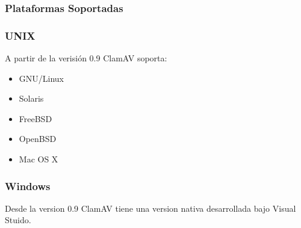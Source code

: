 \subsubsection{Plataformas Soportadas}

\subsubsection*{UNIX}

A partir de la  verisión 0.9 ClamAV soporta:
\begin{itemize}
 \item GNU/Linux
 \item Solaris
 \item FreeBSD
 \item OpenBSD
 \item Mac OS X
\end{itemize}

\subsubsection*{Windows}

Desde la  version 0.9  ClamAV tiene  una version nativa desarrollada bajo
Visual Stuido.


